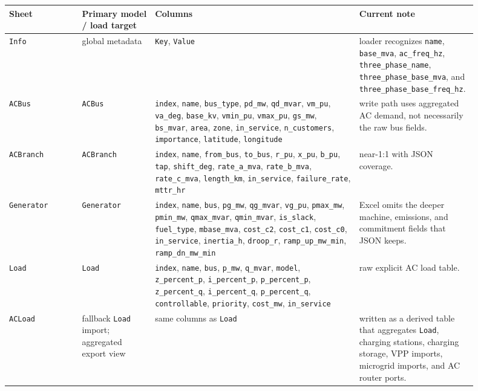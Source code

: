 \footnotesize
\begin{longtable}{L{0.15\linewidth}L{0.15\linewidth}L{0.42\linewidth}L{0.18\linewidth}}
\toprule
Sheet & Primary model / load target & Columns & Current note \\
\midrule
\endhead
\texttt{Info} & global metadata & \texttt{Key}, \texttt{Value} & loader recognizes \texttt{name}, \texttt{base\_mva}, \texttt{ac\_freq\_hz}, \texttt{three\_phase\_name}, \texttt{three\_phase\_base\_mva}, and \texttt{three\_phase\_base\_freq\_hz}. \\
\texttt{ACBus} & \texttt{ACBus} & \texttt{index}, \texttt{name}, \texttt{bus\_type}, \texttt{pd\_mw}, \texttt{qd\_mvar}, \texttt{vm\_pu}, \texttt{va\_deg}, \texttt{base\_kv}, \texttt{vmin\_pu}, \texttt{vmax\_pu}, \texttt{gs\_mw}, \texttt{bs\_mvar}, \texttt{area}, \texttt{zone}, \texttt{in\_service}, \texttt{n\_customers}, \texttt{importance}, \texttt{latitude}, \texttt{longitude} & write path uses aggregated AC demand, not necessarily the raw bus fields. \\
\texttt{ACBranch} & \texttt{ACBranch} & \texttt{index}, \texttt{name}, \texttt{from\_bus}, \texttt{to\_bus}, \texttt{r\_pu}, \texttt{x\_pu}, \texttt{b\_pu}, \texttt{tap}, \texttt{shift\_deg}, \texttt{rate\_a\_mva}, \texttt{rate\_b\_mva}, \texttt{rate\_c\_mva}, \texttt{length\_km}, \texttt{in\_service}, \texttt{failure\_rate}, \texttt{mttr\_hr} & near-1:1 with JSON coverage. \\
\texttt{Generator} & \texttt{Generator} & \texttt{index}, \texttt{name}, \texttt{bus}, \texttt{pg\_mw}, \texttt{qg\_mvar}, \texttt{vg\_pu}, \texttt{pmax\_mw}, \texttt{pmin\_mw}, \texttt{qmax\_mvar}, \texttt{qmin\_mvar}, \texttt{is\_slack}, \texttt{fuel\_type}, \texttt{mbase\_mva}, \texttt{cost\_c2}, \texttt{cost\_c1}, \texttt{cost\_c0}, \texttt{in\_service}, \texttt{inertia\_h}, \texttt{droop\_r}, \texttt{ramp\_up\_mw\_min}, \texttt{ramp\_dn\_mw\_min} & Excel omits the deeper machine, emissions, and commitment fields that JSON keeps. \\
\texttt{Load} & \texttt{Load} & \texttt{index}, \texttt{name}, \texttt{bus}, \texttt{p\_mw}, \texttt{q\_mvar}, \texttt{model}, \texttt{z\_percent\_p}, \texttt{i\_percent\_p}, \texttt{p\_percent\_p}, \texttt{z\_percent\_q}, \texttt{i\_percent\_q}, \texttt{p\_percent\_q}, \texttt{controllable}, \texttt{priority}, \texttt{cost\_mw}, \texttt{in\_service} & raw explicit AC load table. \\
\texttt{ACLoad} & fallback \texttt{Load} import; aggregated export view & same columns as \texttt{Load} & written as a derived table that aggregates \texttt{Load}, charging stations, charging storage, VPP imports, microgrid imports, and AC router ports. \\

\end{longtable}
